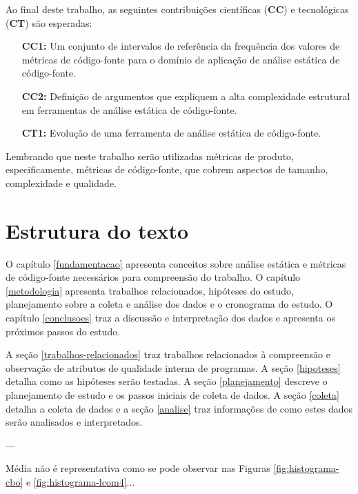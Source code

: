 Ao final deste trabalho, as seguintes contribuições científicas ({\bf CC}) e
tecnológicas ({\bf CT}) são esperadas:

\begin{enumerate}
  \item [{\bf CC1:}] Um conjunto de intervalos de referência da frequência dos
    valores de métricas de código-fonte para o domínio de aplicação de
    análise estática de código-fonte.
  \item [{\bf CC2:}] Definição de argumentos que expliquem a alta complexidade
    estrutural em ferramentas de análise estática de código-fonte.
  \item [{\bf CT1:}] Evolução de uma ferramenta de análise estática de
    código-fonte.
\end{enumerate}

Lembrando que neste trabalho serão utilizadas métricas de produto,
especificamente, métricas de código-fonte, que cobrem aspectos de tamanho,
complexidade e qualidade.

\section{Estrutura do texto} 

O capítulo \ref{fundamentacao} apresenta conceitos sobre análise estática e
métricas de código-fonte necessários para compreensão do trabalho. O capítulo
\ref{metodologia} apresenta trabalhos relacionados, hipóteses do estudo,
planejamento sobre a coleta e análise dos dados
e o cronograma do estudo. O capítulo \ref{conclusoes} traz a
discussão e interpretação dos dados e apresenta os próximos passos do estudo.

A seção \ref{trabalhos-relacionados} traz trabalhos relacionados à compreensão
e observação de atributos de qualidade interna de programas. A seção
\ref{hipoteses} detalha como as hipóteses serão testadas. A seção
\ref{planejamento} descreve o planejamento de estudo e os passos iniciais de
coleta de dados. A seção \ref{coleta} detalha a coleta de dados e a seção
\ref{analise} traz informações de como estes dados serão analisados e
interpretados.

---

Média não é representativa como se pode observar nas Figuras \ref{fig:histograma-cbo} e \ref{fig:histograma-lcom4}...


